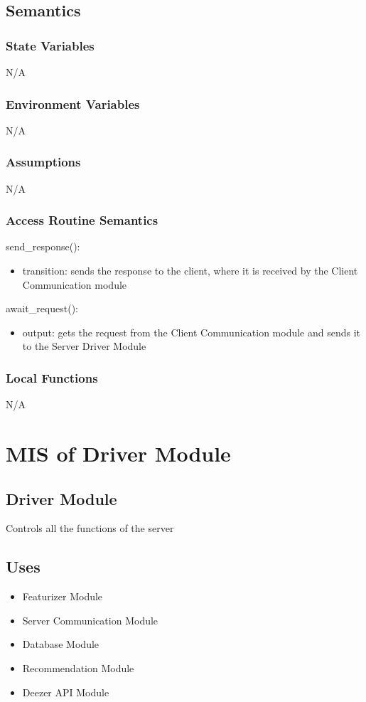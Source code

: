 \documentclass[12pt, titlepage]{article}
\begin{document}
\subsection{Semantics}

\subsubsection{State Variables}
N/A

\subsubsection{Environment Variables}
N/A

\subsubsection{Assumptions}
N/A

\subsubsection{Access Routine Semantics}

\noindent send\_response():
\begin{itemize}
\item transition: sends the response to the client, where it is received by the Client Communication module 
\end{itemize}
\noindent await\_request():
\begin{itemize} 
  \item output: gets the request from the Client Communication module and sends it to the Server Driver Module  
\end{itemize}

\subsubsection{Local Functions}
N/A

\section{MIS of Driver Module} 

\subsection{Driver Module}
Controls all the functions of the server
\subsection{Uses}
\begin{itemize}
  \item Featurizer Module
  \item Server Communication Module
  \item Database Module
  \item Recommendation Module
  \item Deezer API Module
\end{itemize}
\end{document}
